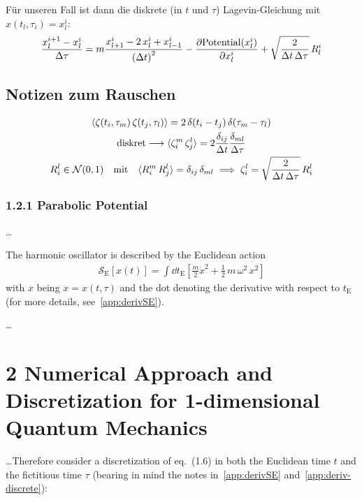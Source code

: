 \documentclass[11pt,a4paper]{scrartcl}
\newcommand{\action}{\ensuremath{\mathcal{S}}}
\begin{document}
Für unseren Fall ist dann die diskrete (in $t$ und $\tau$) Lagevin-Gleichung mit
$x(t_l,\tau_i)=x_l^i$:
\begin{equation}
    \frac{x_l^{i+1}-x_l^i}{\Delta\tau}=m\frac{x_{l+1}^i-2\,x_l^i+x_{l-1}^i}{\left(\Delta{t}\right)^2}-\pdv{\mathrm{Potential}(x_l^i)}{x_l^i}+\sqrt{\frac{2}{\Delta{t}\,\Delta\tau}}\,R_l^i
\end{equation}

\subsection*{Notizen zum Rauschen}
\begin{gather*}
    \langle\zeta(t_i,\tau_m)\,\zeta(t_j,\tau_l)\rangle=2\,\delta(t_i-t_j)\,\delta(\tau_m-\tau_l)
    \\
    \text{diskret}\longrightarrow\langle\zeta_i^m\,\zeta_j^l\rangle=2\frac{\delta_{ij}}{\Delta{t}}\frac{\delta_{ml}}{\Delta{\tau}}
    \\
    R_i^l\in\mathcal{N}(0,1)\qq{mit}\langle{R_i^m\,R_j^l}\rangle=\delta_{ij}\,\delta_{ml}
    \implies \zeta_i^l=\sqrt{\frac{2}{\Delta{t}\,\Delta{\tau}}}\,R_i^l
\end{gather*}


\newpage


\subsubsection*{1.2.1 Parabolic Potential}
\dots

The harmonic oscillator is described by the Euclidean action
\begin{align}
    \action_\mathrm{E}\left[x(t)\right] =
    \int\dd{t_\mathrm{E}}\left[\frac{m}{2}\dot{x}^2 +
        \frac{1}{2}\,m\,\omega^2\,x^2\right]
\end{align}
with $x$ being $x = x(t, \tau )$ and the dot denoting the derivative with
respect to $t_\mathrm{E}$ (for more details, see~\ref{app:derivSE}).

\dots


\section*{2 Numerical Approach and Discretization for 1-dimensional Quantum
Mechanics}
\dots Therefore consider a discretization of eq.~(1.6) in
both the Euclidean time $t$ and the fictitious time $\tau$ (bearing in mind the
notes in~\ref{app:derivSE} and~\ref{app:deriv-discrete}):
\end{document}
